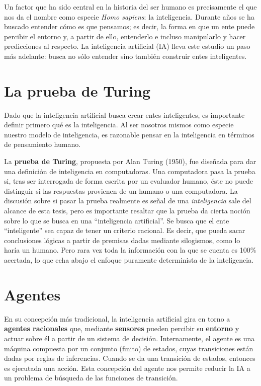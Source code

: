 Un factor que ha sido central en la historia del ser humano es
precisamente el que nos da el nombre como especie \textit{Homo
sapiens}: la inteligencia. Durante años se ha buscado entender cómo es
que pensamos; es decir, la forma en que un ente puede percibir el
entorno y, a partir de ello, entenderlo e incluso manipularlo y hacer
predicciones al respecto.  La inteligencia artificial (IA) lleva este
estudio un paso más adelante: busca no sólo entender sino también
construir entes inteligentes.

\section{La prueba de Turing}
Dado que la inteligencia artificial busca crear entes inteligentes,
es importante definir primero qué es la inteligencia. Al ser nosotros
mismos como especie nuestro modelo de inteligencia, es razonable pensar
en la inteligencia en términos de pensamiento humano.

La \textbf{prueba de Turing}, propuesta por Alan Turing (1950), fue
diseñada para dar una definición de inteligencia en computadoras. Una
computadora pasa la prueba si, tras ser interrogada de forma escrita
por un evaluador humano, éste no puede distinguir si las respuestas
provienen de un humano o una computadora.  La discusión sobre si pasar
la prueba realmente es señal de una \textit{inteligencia} sale del
alcance de esta tesis, pero es importante resaltar que la prueba da
cierta noción sobre lo que se busca en una ``inteligencia
artificial''.  Se busca que el ente ``inteligente'' sea capaz de tener
un criterio racional.  Es decir, que pueda sacar conclusiones lógicas
a partir de premisas dadas mediante silogismos, como lo haría un
humano. Pero rara vez toda la información con la que se cuenta es
100\% acertada, lo que echa abajo el enfoque puramente determinista de
la inteligencia.

\section{Agentes}
En su concepción más tradicional, la inteligencia artificial gira en torno a
\textbf{agentes racionales} que, mediante \textbf{sensores} pueden percibir
su \textbf{entorno} y actuar sobre él a partir de un sistema de
decisión.  Internamente, el agente es una máquina compuesta por un
conjunto (finito) de estados, cuyas transiciones están dadas por
reglas de inferencias. Cuando se da una transición de estados,
entonces es ejecutada una acción. Esta concepción del agente nos
permite reducir la IA a un problema de búsqueda de las funciones de
transición.

